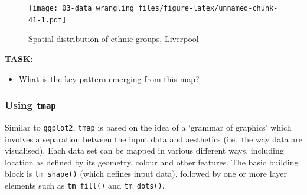 \documentclass[
]{book}
\providecommand{\tightlist}{%
  \setlength{\itemsep}{0pt}\setlength{\parskip}{0pt}}
\begin{document}
\begin{figure}
\centering
\texttt{[image: 03-data\_wrangling\_files/figure-latex/unnamed-chunk-41-1.pdf]}
\caption{\label{fig:unnamed-chunk-41}Spatial distribution of ethnic groups, Liverpool}
\end{figure}

\textbf{TASK:}

\begin{itemize}
\tightlist
\item
  What is the key pattern emerging from this map?
\end{itemize}

\hypertarget{using-tmap}{%
\subsubsection{\texorpdfstring{Using \texttt{tmap}}{Using tmap}}\label{using-tmap}}

Similar to \texttt{ggplot2}, \texttt{tmap} is based on the idea of a `grammar of graphics' which involves a separation between the input data and aesthetics (i.e.~the way data are visualised). Each data set can be mapped in various different ways, including location as defined by its geometry, colour and other features. The basic building block is \texttt{tm\_shape()} (which defines input data), followed by one or more layer elements such as \texttt{tm\_fill()} and \texttt{tm\_dots()}.
\end{document}
